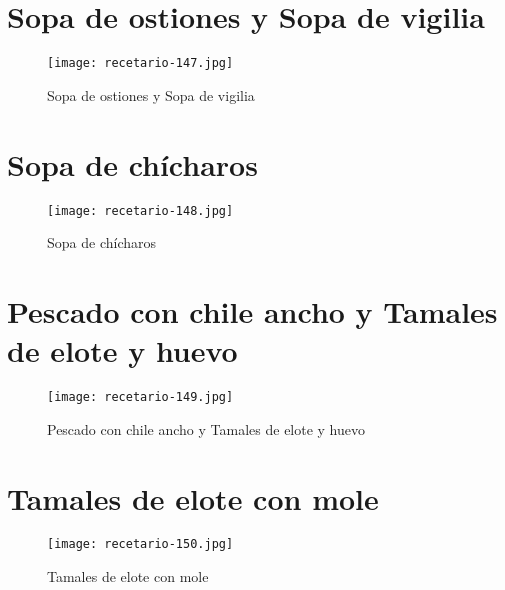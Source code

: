 \documentclass[12pt,letterpaper]{article}
\begin{document}
\newpage

\section{Sopa de ostiones y Sopa de vigilia}
  \begin{figure}[H]
    \vspace{2pt}
  \texttt{[image: recetario-147.jpg]}
    \caption{Sopa de ostiones y Sopa de vigilia}
    
  \end{figure}


\newpage

\section{Sopa de chícharos}
  \begin{figure}[H]
    \vspace{2pt}
  \texttt{[image: recetario-148.jpg]}
    \caption{Sopa de chícharos}
    
  \end{figure}


\newpage

\section{Pescado con chile ancho y Tamales de elote y huevo}
  \begin{figure}[H]
    \vspace{2pt}
  \texttt{[image: recetario-149.jpg]}
    \caption{Pescado con chile ancho y Tamales de elote y huevo}
    
  \end{figure}


\newpage

\section{Tamales de elote con mole}
  \begin{figure}[H]
    \vspace{2pt}
  \texttt{[image: recetario-150.jpg]}
    \caption{Tamales de elote con mole}
    
  \end{figure}


\newpage
\end{document}
